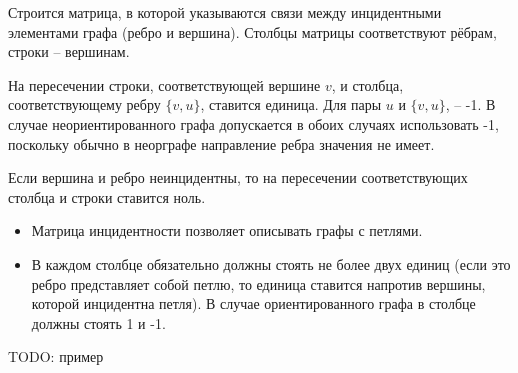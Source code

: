 Строится матрица, в которой указываются связи между инцидентными элементами графа (ребро и вершина). Столбцы матрицы соответствуют рёбрам, строки -- вершинам.

На пересечении строки, соответствующей вершине $v$, и столбца, соответствующему ребру $\{v, u\}$, ставится единица. Для пары $u$ и $\{v, u\}$, -- -1.
В случае неориентированного графа допускается в обоих случаях использовать -1, поскольку обычно в неорграфе направление ребра значения не имеет.

Если вершина и ребро неинцидентны, то на пересечении соответствующих столбца и строки ставится ноль.

\begin{remark}
	\begin{itemize}
		\item Матрица инцидентности позволяет описывать графы с петлями.
		\item В каждом столбце обязательно должны стоять не более двух единиц (если это ребро представляет собой петлю, то единица ставится напротив вершины, которой инцидентна петля). В случае ориентированного графа в столбце должны стоять 1 и -1.
	\end{itemize}
\end{remark}

TODO: пример